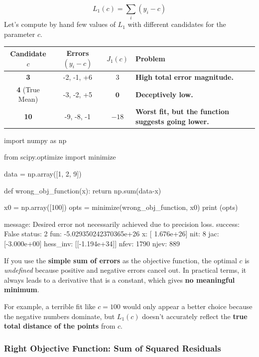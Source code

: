 $$L_1(c) = \sum_{i} (y_i - c)$$
Let's compute by hand few values of $L_1$ with different candidates for the parameter $c$.

\begin{table}[h]
	\centering
	\begin{tabular}{cccl}
		\toprule
		\textbf{Candidate $c$} & \textbf{Errors $(y_i - c)$} & \textbf{$J_1(c)$} & \textbf{Problem} \\
		\midrule
		\textbf{3} & -2, -1, +6 & $3$ & \textbf{High total error magnitude.} \\
		\textbf{4} (True Mean) & -3, -2, +5 & $\mathbf{0}$ & \textbf{Deceptively low.} \\
		\textbf{10} & -9, -8, -1 & $-18$ & \textbf{Worst fit, but the function suggests going lower.} \\
		\bottomrule
	\end{tabular}
\end{table}

\begin{ipythonnon}
import numpy as np

from scipy.optimize import minimize

data = np.array([1, 2, 9])

def wrong_obj_function(x):
  return np.sum(data-x)

x0 = np.array([100])
opts = minimize(wrong_obj_function, x0)
print (opts)
\end{ipythonnon}
\begin{ioutput}
  message: Desired error not necessarily achieved due to precision loss.
  success: False
   status: 2
      fun: -5.029350242370365e+26
        x: [ 1.676e+26]
      nit: 8
      jac: [-3.000e+00]
 hess_inv: [[-1.194e+34]]
     nfev: 1790
     njev: 889
\end{ioutput}

If you use the \textbf{simple sum of errors} as the objective function, the optimal $c$ is \textit{undefined} because positive and negative errors cancel out. In practical terms, it always leads to a derivative that is a constant, which gives \textbf{no meaningful minimum}.

For example, a terrible fit like $c=100$ would only appear a better choice because the negative numbers dominate, but $L_1(c)$ doesn't accurately reflect the \textbf{true total distance of the points} from $c$.

\subsubsection{Right Objective Function: Sum of Squared Residuals}

